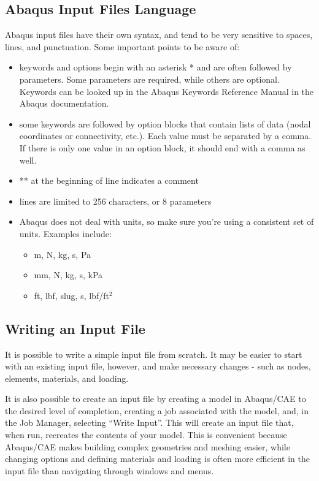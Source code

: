 \documentclass[10pt,letterpaper,oneside]{report}
\begin{document}
\subsection{Abaqus Input Files Language}
Abaqus input files have their own syntax, and tend to be very sensitive to spaces, lines, and punctuation.  Some important points to be aware of: 
\begin{itemize}
\item keywords and options begin with an asterisk * and are often followed by parameters.  Some parameters are required, while others are optional.  Keywords can be looked up in the Abaqus Keywords Reference Manual in the Abaqus documentation.  
\item some keywords are followed by option blocks that contain lists of data (nodal coordinates or connectivity, etc.).  Each value must be separated by a comma.  If there is only one value in an option block, it should end with a comma as well.  
\item ** at the beginning of line indicates a comment
\item lines are limited to 256 characters, or 8 parameters
\item Abaqus does not deal with units, so make sure you're using a consistent set of units.  Examples include: 
  \begin{itemize}
  \item m, N, kg, s, Pa
  \item mm, N, kg, s, kPa
  \item ft, lbf, slug, s, lbf/ft$^2$
  \end{itemize}
\end{itemize}

\subsection{Writing an Input File}
It is possible to write a simple input file from scratch.  It may be easier to start with an existing input file, however, and make necessary changes - such as nodes, elements, materials, and loading.

It is also possible to create an input file by creating a model in Abaqus/CAE to the desired level of completion, creating a job associated with the model, and, in the Job Manager, selecting ``Write Input''.  This will create an input file that, when run, recreates the contents of your model.  This is convenient because Abaqus/CAE makes building complex geometries and meshing easier, while changing options and defining materials and loading is often more efficient in the input file than navigating through windows and menus.  
\end{document}
